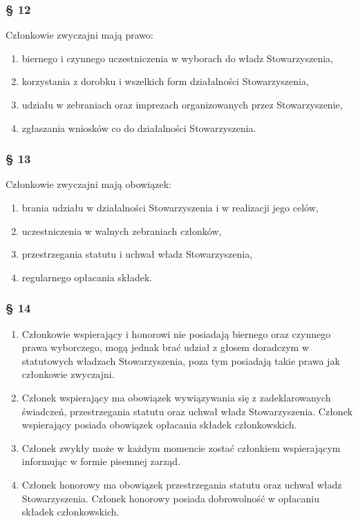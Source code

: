 \documentclass{article}
\newcommand{\myparagraph}[1]{\subsubsection*{#1}}
\begin{document}
\myparagraph{§ 12}
Członkowie zwyczajni mają prawo:
\begin{enumerate}
\item
  biernego i czynnego uczestniczenia w wyborach do władz Stowarzyszenia,
\item
  korzystania z dorobku i wszelkich form działalności Stowarzyszenia,
\item
  udziału w zebraniach oraz imprezach organizowanych przez Stowarzyszenie,
\item
  zgłaszania wniosków co do działalności Stowarzyszenia.
\end{enumerate}

\myparagraph{§ 13}
Członkowie zwyczajni mają obowiązek:
\begin{enumerate}
\item
  brania udziału w działalności Stowarzyszenia i w realizacji jego celów,
\item
  uczestniczenia w walnych zebraniach członków,
\item
  przestrzegania statutu i uchwał władz Stowarzyszenia,
\item
  regularnego opłacania składek.
\end{enumerate}

\myparagraph{§ 14}
\begin{enumerate}
\item
  Członkowie wspierający i honorowi nie posiadają biernego oraz czynnego prawa wyborczego, mogą jednak brać udział z głosem doradczym w statutowych władzach Stowarzyszenia, poza tym posiadają takie prawa jak członkowie zwyczajni.
\item
  Członek wspierający ma obowiązek wywiązywania się z zadeklarowanych świadczeń, przestrzegania statutu oraz uchwał władz Stowarzyszenia. Członek wspierający posiada obowiązek opłacania składek członkowskich.
\item
  Członek zwykły może w każdym momencie zostać członkiem wspierającym informując w formie pisemnej zarząd.
\item
  Członek honorowy ma obowiązek przestrzegania statutu oraz uchwał władz Stowarzyszenia. Członek honorowy posiada dobrowolność w opłacaniu składek członkowskich.
\end{enumerate}
\end{document}
